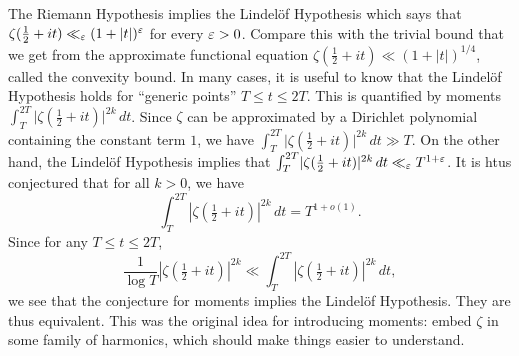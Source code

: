 \documentclass[reqno]{amsart} 
\numberwithin{theorem}{section}
\numberwithin{equation}{section}
\begin{document}
The Riemann Hypothesis implies the Lindelöf Hypothesis which says that $\zeta(\tfrac{1}{2} + i t) \ll_\varepsilon(1 + \lvert t \rvert)^\varepsilon$ for every $\varepsilon > 0$.  Compare this with the trivial bound that we get from the approximate functional equation $\zeta(\tfrac{1}{2} + i t) \ll(1 + \lvert t \rvert)^{1/4}$, called the convexity bound.  In many cases, it is useful to know that the Lindelöf Hypothesis holds for ``generic points'' $T \leq t \leq 2 T$.  This is quantified by moments $\int_T^{2 T} \lvert \zeta(\tfrac{1}{2} + i t) \rvert^{2 k} \, d t$.  Since $\zeta$ can be approximated by a Dirichlet polynomial containing the constant term $1$, we have $\int_T^{2 T} \lvert \zeta(\tfrac{1}{2} + i t) \rvert^{2 k} \, d t \gg T$.  On the other hand, the Lindelöf Hypothesis implies that $\int_T^{2 T} \lvert \zeta(\tfrac{1}{2} + i t) \rvert^{2 k} \, d t \ll_\varepsilon T^{1 + \varepsilon}$.  It is htus conjectured that for all $k > 0$, we have
\begin{equation}\label{eq:cq1zddl298}
  \int_T^{2 T} \left\lvert \zeta(\tfrac{1}{2} + i t) \right\rvert^{2 k} \, d t = T^{1 + o(1)}.
\end{equation}
Since for any $T \leq t \leq 2 T$,
\begin{equation}\label{eq:cq1zdd63vg}
  \frac{1}{\log T} \left\lvert \zeta(\tfrac{1}{2} + i t) \right\rvert^{2 k} \ll \int_T^{2 T} \left\lvert \zeta(\tfrac{1}{2} + i t) \right\rvert^{2 k} \, d t,
\end{equation}
we see that the conjecture for moments implies the Lindelöf Hypothesis.  They are thus equivalent.  This was the original idea for introducing moments: embed $\zeta$ in some family of harmonics, which should make things easier to understand.
\end{document}
